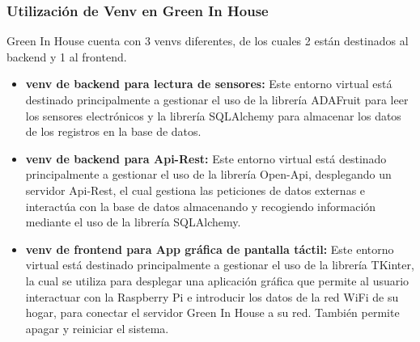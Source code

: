         \subsubsection{Utilización de Venv en Green In House}
        Green In House cuenta con 3 venvs diferentes, de los cuales 2 están destinados al backend y 1 al frontend. 
        \begin{itemize}
            \item \textbf{venv de backend para lectura de sensores:} Este entorno virtual está destinado principalmente a gestionar el uso de la librería ADAFruit para leer los sensores electrónicos y la librería SQLAlchemy para almacenar los datos de los registros en la base de datos.
            \item \textbf{venv de backend para Api-Rest:} Este entorno virtual está destinado principalmente a gestionar el uso de la librería Open-Api, desplegando un servidor Api-Rest, el cual gestiona las peticiones de datos externas e interactúa con la base de datos almacenando y recogiendo información mediante el uso de la librería SQLAlchemy.
            \item \textbf{venv de frontend para App gráfica de pantalla táctil:} Este entorno virtual está destinado principalmente a gestionar el uso de la librería TKinter, la cual se utiliza para desplegar una aplicación gráfica que permite al usuario interactuar con la Raspberry Pi e introducir los datos de la red WiFi de su hogar, para conectar el servidor Green In House a su red. También permite apagar y reiniciar el sistema.
        \end{itemize}

